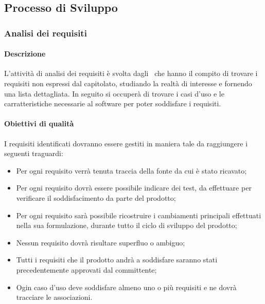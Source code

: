 \documentclass[../NormeDiProgetto_v4.0.0.tex]{subfiles}
\begin{document}
	\subsection{Processo di Sviluppo}
		\subsubsection{Analisi dei requisiti}
			\paragraph{Descrizione}
			L'attività di analisi dei requisiti è svolta dagli \analisti\ che hanno il compito di trovare i requisiti non espressi dal capitolato, studiando la realtà di interesse e fornendo una lista dettagliata.
			In seguito si occuperà di trovare i casi d'uso e le carratteristiche necessarie al software per poter soddisfare i requisiti.

 			\paragraph{Obiettivi di qualità}
				I requisiti identificati dovranno essere gestiti in maniera tale da raggiungere i seguenti traguardi:
				\begin{itemize}
					\item Per ogni requisito verrà tenuta traccia della fonte da cui è stato ricavato;
					\item Per ogni requisito dovrà essere possibile indicare dei test, da effettuare per verificare il soddisfacimento da parte del prodotto;
					\item Per ogni requisito sarà possibile ricostruire i cambiamenti principali effettuati nella sua formulazione, durante tutto il ciclo di sviluppo del prodotto;
					\item Nessun requisito dovrà risultare superfluo o ambiguo;
					\item Tutti i requisiti che il prodotto andrà a soddisfare saranno stati precedentemente approvati dal committente;
					\item Ogin caso d'uso deve soddisfare almeno uno o più requisiti e ne dovrà tracciare le associazioni.
				\end{itemize}
\end{document}
